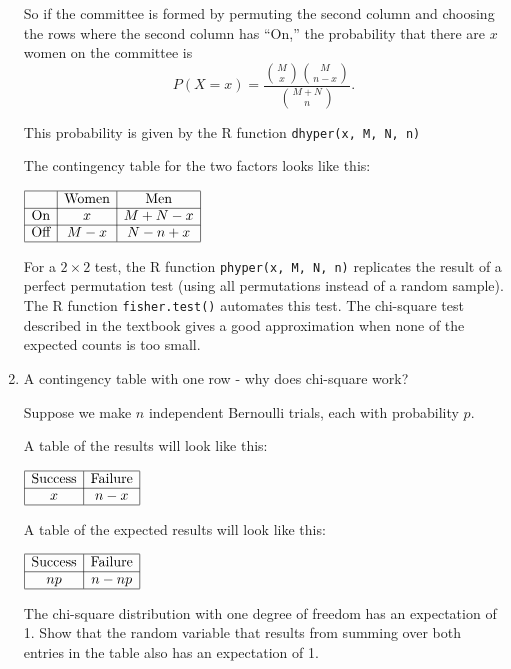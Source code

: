 \documentclass[12pt]{article}
\begin{document}
\begin{enumerate}
So if the committee is formed by permuting the second column and choosing the rows where the second column has ``On,'' the probability that there are $x$ women on the committee is
$$P(X = x) = \frac{\binom{M}{x}\binom{M}{n-x}}{\binom{M+N}{n}}.$$

This probability is given by the R function \verb!dhyper(x, M, N, n)!

The contingency table for the two factors looks like this:

$\begin{array}{|c|c|c|}
\hline
 & \mbox{Women} & \mbox{Men} \\
\cline{1-3}
\text{On}  & x &  M+N-x\\
\cline{1-3}
\text{Off}  & M-x & N-n+x\\
\hline
\end{array}$

For a $2 \times 2$ test, the R function \verb!phyper(x, M, N, n)! replicates the result of a perfect permutation test (using all permutations instead of a random sample). The R function \verb!fisher.test()! automates this test. The chi-square test described in the textbook gives a good approximation when none of the expected counts is too small.

\pagebreak

\item A contingency table with one row - why does chi-square work?

Suppose we make $n$ independent Bernoulli trials, each with probability $p$.

A table of the results will look like this:

$\begin{array}{|c|c|}
\hline
 \mbox{Success} & \mbox{Failure} \\
\cline{1-2}
   x &  n-x\\

\hline
\end{array}$

A table of the expected results will look like this:

$\begin{array}{|c|c|}
\hline
 \mbox{Success} & \mbox{Failure} \\
\cline{1-2}
   np &  n-np\\

\hline
\end{array}$

The chi-square distribution with one degree of freedom has an expectation of 1. Show that the random variable that results from summing over both entries in the table also has an expectation of 1.






\end{enumerate}
\end{document}
